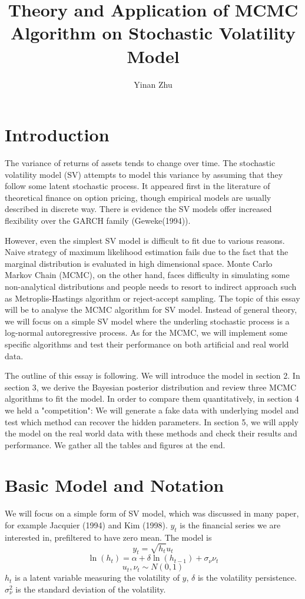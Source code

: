 \documentclass{article}
\title{Theory and Application of MCMC Algorithm on Stochastic Volatility Model}
\author{Yinan Zhu}
\date{}
\begin{document}
\maketitle
\section{Introduction}
The variance of returns of assets tends to change over time. The stochastic volatility model (SV) attempts to model this variance by assuming that they follow some latent stochastic process. It appeared first in the literature of theoretical finance on option pricing, though empirical models are usually described in discrete way. There is evidence the SV models offer increased flexibility over the GARCH family (Geweke(1994)).

However, even the simplest SV model is difficult to fit due to various reasons. Naive strategy of maximum likelihood estimation fails due to the fact that the marginal distribution is evaluated in high dimensional space. Monte Carlo Markov Chain (MCMC), on the other hand, faces difficulty in simulating some non-analytical distributions and people needs to resort to indirect approach such as Metroplis-Hastings algorithm or reject-accept sampling. The topic of this essay will be to analyse the MCMC algorithm for SV model. Instead of general theory, we will focus on a simple SV model where the underling stochastic process is a log-normal autoregressive process. As for the MCMC, we will implement some specific algorithms and test their performance on both artificial and real world data.

The outline of this essay is following. We will introduce the model in section 2.  In section 3, we derive the Bayesian posterior distribution and review three MCMC algorithms to fit the model. In order to compare them quantitatively, in section 4 we held a "competition": We will generate a fake data with underlying model and test which method can recover the hidden parameters. In section 5, we will apply the model on the real world data with these methods and check their results and performance. We gather all the tables and figures at the end.
\section{Basic Model and Notation}
We will focus on a simple form of SV model, which was discussed in many paper, for example Jacquier (1994) and Kim (1998). $y_t$ is the financial series we are interested in, prefiltered to have zero mean. The model is
\[
y_t=\sqrt{h_t}u_t
\]
\[
\ln(h_t)=\alpha+\delta\ln(h_{t-1})+\sigma_\nu\nu_t
\]
\[
u_t,\nu_t\sim N(0,1)
\]
$h_t$ is a latent variable measuring the volatility of $y$, $\delta$ is the volatility persistence. $\sigma_\nu^2$ is the standard deviation of the volatility.
\end{document}
